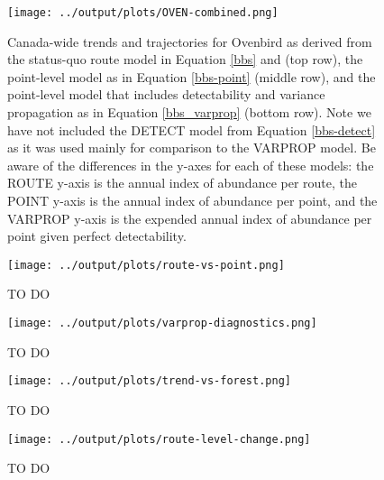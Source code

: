 \documentclass[12pt]{article}
\begin{document}
\begin{figure}[h!]
	\texttt{[image: ../output/plots/OVEN-combined.png]}
	\caption{Canada-wide trends and trajectories for Ovenbird as derived from the status-quo route model in Equation \ref{bbs} and \citet{smith_spatially_2023} (top row), the point-level model as in Equation \ref{bbs-point} (middle row), and the point-level model that includes detectability and variance propagation as in Equation \ref{bbs_varprop} (bottom row). Note we have not included the DETECT model from Equation \ref{bbs-detect} as it was used mainly for comparison to the VARPROP model. Be aware of the differences in the y-axes for each of these models: the ROUTE y-axis is the annual index of abundance per route, the POINT y-axis is the annual index of abundance per point, and the VARPROP y-axis is the expended annual index of abundance per point given perfect detectability.}
	\label{fig:oven-combined}
\end{figure}

\begin{figure}[h]
	\texttt{[image: ../output/plots/route-vs-point.png]}
	\caption{TO DO}
	\label{fig:route-vs-point}
\end{figure}

\begin{figure}[h]
	\texttt{[image: ../output/plots/varprop-diagnostics.png]}
	\caption{TO DO}
	\label{fig:varprop-diagnostics}
\end{figure}

\begin{figure}[h]
	\texttt{[image: ../output/plots/trend-vs-forest.png]}
	\caption{TO DO}
	\label{fig:trend-vs-forest}
\end{figure}

\begin{figure}[h]
	\texttt{[image: ../output/plots/route-level-change.png]}
	\caption{TO DO}
	\label{fig:route-change}
\end{figure}
\end{document}
